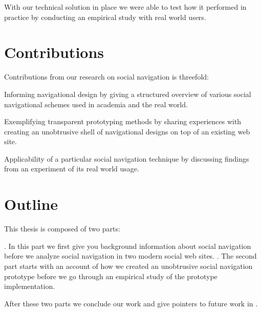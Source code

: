 With our technical solution in place we were able to test how it performed in
practice by conducting an empirical study with real world users.

\section{Contributions}

Contributions from our research on social navigation is threefold:

\begin{enum}
  \item Informing navigational design by giving a structured overview of
    various social navigational schemes used in academia and the real world.
  \item Exemplifying transparent prototyping methods by sharing experiences
    with creating an unobtrusive shell of navigational designs on top of an
    existing web site.
  \item Applicability of a particular social navigation technique
    by discussing findings from an experiment of its real world usage.
\end{enum}

\section{Outline}

This thesis is composed of two parts:

\begin{enum}
  . In this part we first give you
    background information about social navigation before
    we analyze social navigation in two modern social web sites.
  . The second part starts
    with an account of how we created an unobtrusive social navigation
    prototype before we go through an empirical study of the prototype
    implementation.
\end{enum}

After these two parts we conclude our work and give pointers to future work
in .

